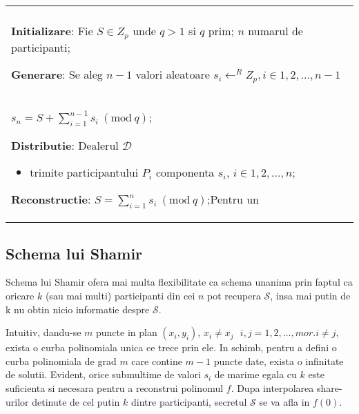 \documentclass{llncs}
\newcommand{\Mod}[1]{\ (\text{mod}\ #1)}
\begin{document}
\begin{figure*}[h!]

\begin{tabular}{|p{\textwidth}|}
\hline

\\
\hspace{.1in}
\textbf{Initializare}: Fie $S \in Z_p$ unde $q > 1 $ si $q$ prim; $n$ numarul de participanti;
\medskip

\hspace{.1in}
\textbf{Generare}: Se aleg $n - 1$ valori aleatoare $s_i \leftarrow^R Z_p, i \in 1,2,\dots,{n-1}$ \\
		\hspace{.9in}  $s_n = S + \sum_{i=1}^{n-1} s_i \Mod q $;
\medskip

\hspace{.1in}
\textbf{Distributie}: Dealerul $\mathcal{D}$
	\begin{itemize}
		\item trimite participantului $P_i$ componenta $s_i$, $i \in 1,2,\dots,n$;
	\end{itemize}

\hspace{.1in}
\textbf{Reconstructie}: $S = \sum_{i=1}^{n} s_i \Mod q$;Pentru un 

\\
\hline
\end{tabular}

\label{fig:all_or_nothing}
\end{figure*}




\subsection{Schema lui Shamir}

Schema lui Shamir ofera mai multa flexibilitate ca schema unanima prin faptul ca oricare $k$ (sau mai multi) participanti
din cei $n$ pot recupera $\mathcal{S}$, insa mai putin de k nu obtin nicio informatie despre $\mathcal{S}$.

Intuitiv, dandu-se $m$ puncte in plan $(x_i, y_i)$, $x_i \neq x_j \text{ } i,j = 1, 2, \dots, m or. i \neq j$, exista o curba polinomiala unica ce trece prin ele.  
In schimb, pentru a defini o curba polinomiala de grad $m$ care contine $m - 1$ puncte date, exista o infinitate de solutii.
Evident, orice submultime de valori $s_i$ de marime egala cu $k$ este suficienta si necesara pentru a reconstrui polinomul $f$. Dupa interpolarea share-urilor detinute de cel putin $k$ dintre participanti, secretul $\mathcal{S}$ se va afla in $f(0)$.
\end{document}
